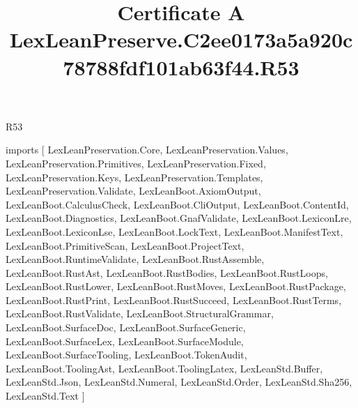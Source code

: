 \begin{lexlean}{R53}
\title{Certificate A LexLeanPreserve.C2ee0173a5a920c78788fdf101ab63f44.R53}
\begin{coremodule}
imports [
  LexLeanPreservation.Core,
  LexLeanPreservation.Values,
  LexLeanPreservation.Primitives,
  LexLeanPreservation.Fixed,
  LexLeanPreservation.Keys,
  LexLeanPreservation.Templates,
  LexLeanPreservation.Validate,
  LexLeanBoot.AxiomOutput,
  LexLeanBoot.CalculusCheck,
  LexLeanBoot.CliOutput,
  LexLeanBoot.ContentId,
  LexLeanBoot.Diagnostics,
  LexLeanBoot.GnafValidate,
  LexLeanBoot.LexiconLre,
  LexLeanBoot.LexiconLse,
  LexLeanBoot.LockText,
  LexLeanBoot.ManifestText,
  LexLeanBoot.PrimitiveScan,
  LexLeanBoot.ProjectText,
  LexLeanBoot.RuntimeValidate,
  LexLeanBoot.RustAssemble,
  LexLeanBoot.RustAst,
  LexLeanBoot.RustBodies,
  LexLeanBoot.RustLoops,
  LexLeanBoot.RustLower,
  LexLeanBoot.RustMoves,
  LexLeanBoot.RustPackage,
  LexLeanBoot.RustPrint,
  LexLeanBoot.RustSucceed,
  LexLeanBoot.RustTerms,
  LexLeanBoot.RustValidate,
  LexLeanBoot.StructuralGrammar,
  LexLeanBoot.SurfaceDoc,
  LexLeanBoot.SurfaceGeneric,
  LexLeanBoot.SurfaceLex,
  LexLeanBoot.SurfaceModule,
  LexLeanBoot.SurfaceTooling,
  LexLeanBoot.TokenAudit,
  LexLeanBoot.ToolingAst,
  LexLeanBoot.ToolingLatex,
  LexLeanStd.Buffer,
  LexLeanStd.Json,
  LexLeanStd.Numeral,
  LexLeanStd.Order,
  LexLeanStd.Sha256,
  LexLeanStd.Text
]


\end{coremodule}
\end{lexlean}
